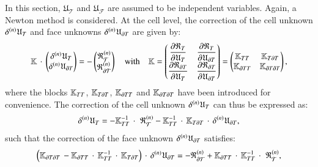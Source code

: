 In this section, $\mathfrak{U}_{\mathcal{T}}$ and
$\mathfrak{U}_{\mathcal{F}}$ are assumed to be independent variables.
Again, a Newton method is considered.
%
%
%
At the cell level, the correction of the cell unknown
$\iter{n}{\delta}\mathfrak{U}_{\cell}$ and face unknowns
$\iter{n}{\delta}\mathfrak{U}_{\dCell}$ are given by:
\begin{equation}
\label{eq_static_condensation_final}
\mathbb{K}\,\cdot\,
\begin{pmatrix}
  \iter{n}{\delta}\mathfrak{U}_{\cell}
  \\
  \iter{n}{\delta}\mathfrak{U}_{\dCell}
\end{pmatrix}
= -
\begin{pmatrix}
  \iter{n}{\mathfrak{R}}_{\mathcal{\cell}}
  \\
  \iter{n}{\mathfrak{R}}_{\mathcal{\dCell}}
\end{pmatrix}
\quad\text{with}\quad \mathbb{K} =
\begin{pmatrix}
  \deriv{\mathfrak{R}_{\cell}}{\mathfrak{U}_{\cell}}
  & \deriv{\mathfrak{R}_{\cell}}{\mathfrak{U}_{\dCell}} \\
  \deriv{\mathfrak{R}_{\dCell}}{\mathfrak{U}_{\cell}}
  & \deriv{\mathfrak{R}_{\dCell}}{\mathfrak{U}_{\dCell}} \\
\end{pmatrix}
=
\begin{pmatrix}
  \mathbb{K}_{\cell\cell} &
  \mathbb{K}_{\cell\dCell} \\
  \mathbb{K}_{\dCell\cell} &
  \mathbb{K}_{\dCell\dCell} \\
\end{pmatrix},
\end{equation}
%
%
%
where the blocks \(\mathbb{K}_{\cell\cell}\),
\(\mathbb{K}_{\cell\dCell}\), \(\mathbb{K}_{\dCell\cell}\) and
\(\mathbb{K}_{\dCell\dCell}\) have been introduced for convenience.
%
%
%
The correction of the cell unknown
$\iter{n}{\delta}\mathfrak{U}_{\cell}$ can thus be expressed as:
\begin{equation}
  \label{eq:cell_unknown_correction}
  \iter{n}{\delta}\mathfrak{U}_{\cell}=
  -\mathbb{K}_{\cell\cell}^{-1}\,\cdot\,\,\iter{n}{\mathfrak{R}}_{\mathcal{\cell}}
  -\mathbb{K}_{\cell\cell}^{-1}\,\cdot\,\mathbb{K}_{\cell\dCell}\,\cdot\,\iter{n}{\delta}\mathfrak{U}_{\dCell},
\end{equation}
%
%
%
such that the correction of the face unknown
$\iter{n}{\delta}\mathfrak{U}_{\dCell}$ satisfies:
\[
\paren{ \mathbb{K}_{\dCell\dCell}\,
  -\mathbb{K}_{\dCell\cell}\,\cdot\,\mathbb{K}_{\cell\cell}^{-1}\,\cdot\,\mathbb{K}_{\cell\dCell}
 }\,\cdot\, \iter{n}{\delta}\mathfrak{U}_{\dCell}=
-\iter{n}{\mathfrak{R}}_{\mathcal{\dCell}}
+\mathbb{K}_{\dCell\cell}\,\cdot\,\mathbb{K}_{\cell\cell}^{-1}\,\cdot\,\,\iter{n}{\mathfrak{R}}_{\mathcal{\cell}},
\]
